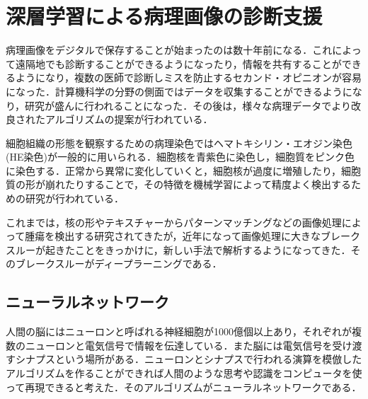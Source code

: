 \chapter{深層学習による病理画像の診断支援}
\label{chap_review}

病理画像をデジタルで保存することが始まったのは数十年前になる．これによって遠隔地でも診断することができるようになったり，情報を共有することができるようになり，複数の医師で診断しミスを防止するセカンド・オピニオンが容易になった．計算機科学の分野の側面ではデータを収集することができるようになり，研究が盛んに行われることになった．その後は，様々な病理データでより改良されたアルゴリズムの提案が行われている．

細胞組織の形態を観察するための病理染色ではヘマトキシリン・エオジン染色(HE染色)が一般的に用いられる．細胞核を青紫色に染色し，細胞質をピンク色に染色する．正常から異常に変化していくと，細胞核が過度に増殖したり，細胞質の形が崩れたりすることで，その特徴を機械学習によって精度よく検出するための研究が行われている．

これまでは，核の形やテキスチャーからパターンマッチングなどの画像処理によって腫瘍を検出する研究されてきたが，近年になって画像処理に大きなブレークスルーが起きたことをきっかけに，新しい手法で解析するようになってきた．そのブレークスルーがディープラーニングである．

\section{ニューラルネットワーク}
人間の脳にはニューロンと呼ばれる神経細胞が1000億個以上あり，それぞれが複数のニューロンと電気信号で情報を伝達している．また脳には電気信号を受け渡すシナプスという場所がある．ニューロンとシナプスで行われる演算を模倣したアルゴリズムを作ることができれば人間のような思考や認識をコンピュータを使って再現できると考えた．そのアルゴリズムがニューラルネットワークである．


